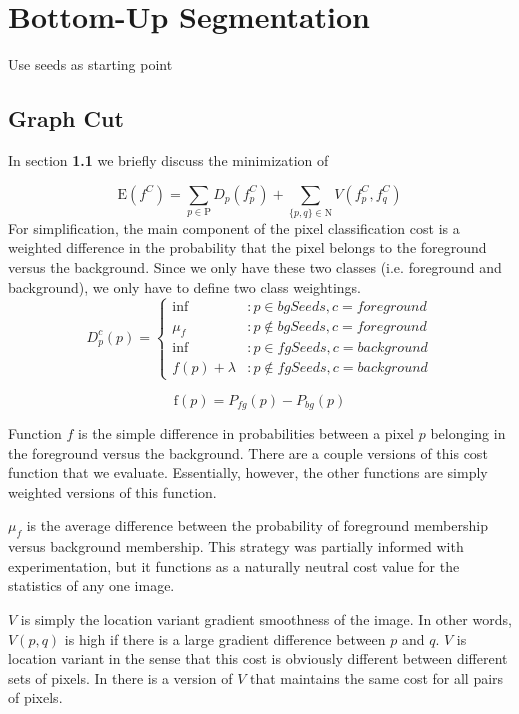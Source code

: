 \documentclass[10pt,twocolumn,letterpaper]{article}
\begin{document}
\section{Bottom-Up Segmentation}

Use seeds as starting point


\subsection{Graph Cut}
In section \textbf{1.1} we briefly discuss the minimization of

\[
\textrm{E}(f^C)  =  \sum_{p \in \textrm{P}}{D_p(\textrm{$f^C_p$}) } + \sum_{\{p,q\} \in \textrm{N}}{V(f^C_p,f^C_q)}
\]
For simplification, the main component of the pixel classification cost is a weighted difference in the probability that the pixel belongs to the foreground versus the background.  Since we only have these two classes (i.e. foreground and background), we only have to define two class weightings.
\begin{displaymath}
	\textrm{$D^c_p$}(p) = \left\{
		\begin{array}{lr}
			\inf & : p \in bgSeeds ,  c = foreground\\
			\textrm{$\mu_f$} & : p \notin bgSeeds,  c = foreground\\
			\inf & : p \in fgSeeds,  c = background\\
			\textrm{$f(p) + \lambda$} & : p \notin fgSeeds,  c = background
		\end{array}
	\right.
\end{displaymath}

\[
\textrm{f}(p) = \textrm{$P_\textrm{$fg$}$}(p) - \textrm{$P_\textrm{$bg$}$}(p)
\]		 

Function $f$ is the simple difference in probabilities between a pixel $p$ belonging in the foreground versus the background.  There are a couple versions of this cost function that we evaluate.  Essentially, however, the other functions are simply weighted versions of this function.

$\mu_f$ is the average difference between the probability of foreground membership versus background membership.  This strategy was partially informed with experimentation, but it functions as a naturally neutral cost value for the statistics of any one image.

$V$ is simply the location variant gradient smoothness of the image.  In other words, $V(p,q)$ is high if there is a large gradient difference between $p$ and $q$.  $V$ is location variant in the sense that this cost is obviously different between different sets of pixels.  In \cite{Boykov2001} there is a version of $V$ that maintains the same cost for all pairs of pixels.
\end{document}
